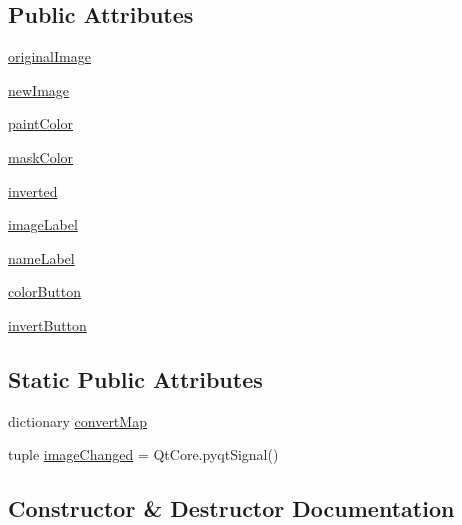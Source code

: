 \subsection*{Public Attributes}
\begin{DoxyCompactItemize}
\item 
\hyperlink{classseparations_1_1ScreenWidget_a1d5128a2c4c37cf87807ad899088954a}{original\+Image}
\item 
\hyperlink{classseparations_1_1ScreenWidget_adbeedd88b7bdd627271363540da0acdd}{new\+Image}
\item 
\hyperlink{classseparations_1_1ScreenWidget_a5cea299824b874d0175e4e1e3df619c8}{paint\+Color}
\item 
\hyperlink{classseparations_1_1ScreenWidget_a9432bb589b03c2af34c73a8ff7984d43}{mask\+Color}
\item 
\hyperlink{classseparations_1_1ScreenWidget_a973256ca6bb42df88e517ba565d8a0a3}{inverted}
\item 
\hyperlink{classseparations_1_1ScreenWidget_a25842ae4f6b5fc370cfb60d689939f5c}{image\+Label}
\item 
\hyperlink{classseparations_1_1ScreenWidget_ac1e7db1832c291af9fedf7247092de8d}{name\+Label}
\item 
\hyperlink{classseparations_1_1ScreenWidget_a9b7b8ed5c8ba7bdb2b68dede043baef4}{color\+Button}
\item 
\hyperlink{classseparations_1_1ScreenWidget_a349d992df97cb09056dfe43d61b642f8}{invert\+Button}
\end{DoxyCompactItemize}
\subsection*{Static Public Attributes}
\begin{DoxyCompactItemize}
\item 
dictionary \hyperlink{classseparations_1_1ScreenWidget_a0acd8e0742bc8fb7c9c0b7de059aaf6b}{convert\+Map}
\item 
tuple \hyperlink{classseparations_1_1ScreenWidget_a1827a062a78667fd0a58ca0a7f3bedb0}{image\+Changed} = Qt\+Core.\+pyqt\+Signal()
\end{DoxyCompactItemize}


\subsection{Constructor \& Destructor Documentation}
\hypertarget{classseparations_1_1ScreenWidget_a58e8a47508966565f38605fa4cb1742c}{}
